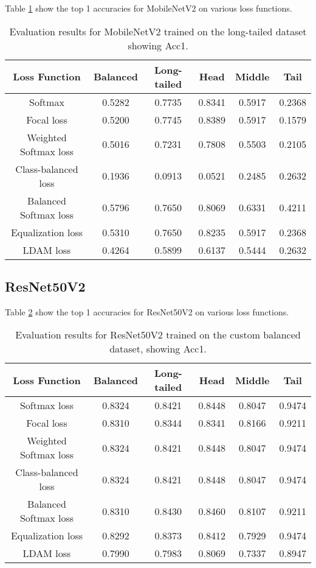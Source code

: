 Table \ref{tab:mobilenet_lt_acc1_1} show the top 1 accuracies for MobileNetV2 on various loss functions.

\begin{table}[H]
    \centering
    \begin{tabular}{cccccc}
        \toprule
        Loss Function & Balanced & Long-tailed & Head & Middle & Tail \\ 
        \midrule
        Softmax   & 0.5282   & 0.7735 & 0.8341 & 0.5917 & 0.2368 \\
        Focal loss   & 0.5200   & 0.7745 & 0.8389 & 0.5917 & 0.1579 \\
        Weighted Softmax loss   & 0.5016   & 0.7231 & 0.7808 & 0.5503 & 0.2105 \\
        Class-balanced loss   & 0.1936   & 0.0913 & 0.0521 & 0.2485 & 0.2632 \\
        Balanced Softmax loss   & 0.5796   & 0.7650 & 0.8069 & 0.6331 & 0.4211 \\
        Equalization loss   & 0.5310   & 0.7650 & 0.8235 & 0.5917 & 0.2368 \\
        LDAM loss   & 0.4264 & 0.5899 & 0.6137 & 0.5444 & 0.2632 \\
        \bottomrule
    \end{tabular}
    \caption{Evaluation results for MobileNetV2 trained on the long-tailed dataset showing Acc1.}
    \label{tab:mobilenet_lt_acc1_1}
\end{table}

\subsection{ResNet50V2}

Table \ref{tab:resnet_bal_acc1_1} show the top 1 accuracies for ResNet50V2 on various loss functions.

\begin{table}[H]
    \centering
    \begin{tabular}{cccccc}
        \toprule
        Loss Function & Balanced & Long-tailed & Head & Middle & Tail \\ 
        \midrule
        Softmax loss   & 0.8324  & 0.8421 & 0.8448 & 0.8047 & 0.9474 \\
        Focal loss   & 0.8310  & 0.8344 & 0.8341 & 0.8166 & 0.9211 \\
        Weighted Softmax loss   & 0.8324 & 0.8421 & 0.8448 & 0.8047 & 0.9474 \\
        Class-balanced loss   &  0.8324 & 0.8421 & 0.8448 & 0.8047 & 0.9474 \\
        Balanced Softmax loss   & 0.8310 & 0.8430 & 0.8460 & 0.8107 & 0.9211 \\
        Equalization loss   & 0.8292 & 0.8373 & 0.8412 & 0.7929 & 0.9474 \\
        LDAM loss   & 0.7990 & 0.7983 & 0.8069 & 0.7337 & 0.8947 \\
        \bottomrule
    \end{tabular}
    \caption{Evaluation results for ResNet50V2 trained on the custom balanced dataset, showing Acc1.}
    \label{tab:resnet_bal_acc1_1}
\end{table}

